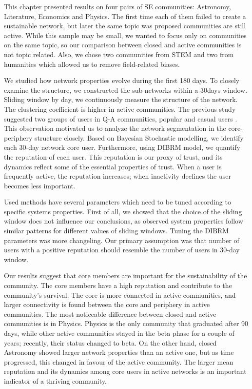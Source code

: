 This chapter presented results on four pairs of SE communities: Astronomy, Literature, Economics and Physics. The first time each of them failed to create a sustainable network, but later the same topic was proposed communities are still active. While this sample may be small, we wanted to focus only on communities on the same topic, so our comparison between closed and active communities is not topic related. Also, we chose two communities from STEM and two from humanities which allowed us to remove field-related biases. 

We studied how network properties evolve during the first 180 days. To closely examine the structure, we constructed the sub-networks within a 30days window. Sliding window by day, we continuously measure the structure of the network. The clustering coefficient is higher in active communities. The previous study suggested two groups of users in Q-A communities, popular and casual users \cite{santos2019self}. This observation motivated us to analyze the network segmentation in the core-periphery structure closely. Based on Bayesian Stochastic modelling, we identify each 30-day network core user.
Furthermore, using DIBRM model\cite{melnikov2018toward}, we quantify the reputation of each user. This reputation is our proxy of trust, and its dynamics reflect some of the essential properties of trust. When a user is frequently active, the reputation increases; when inactivity declines the user becomes less important.   

Used methods have several parameters which need to be tuned according to specific systems properties. First of all, we showed that the choice of the sliding window does not influence our conclusions, as observed system properties follow similar patterns for different values of sliding windows. Tuning the DIBRM parameters was more changeling. Our primary assumption was that number of users with a positive reputation should resemble the number of users in 30-day window.

Our results suggest that core members are important for the sustainability of the community. The core members have a high reputation and contribute to the community's survival. The core is more connected in active communities, and larger connectivity is found between the core and periphery in active communities. The most noticeable difference between closed and active communities is in Physics. Physics is the only community that graduated after 90 days, while other active communities stayed in the beta phase for a couple of years; recently, their status changed to beta. On the other hand, closed Astronomy showed larger network properties than an active one, but as time progressed, this changed in favour of the active community. The larger mean reputation and its dynamics among core users in active networks is an important indicator of a thriving community.

